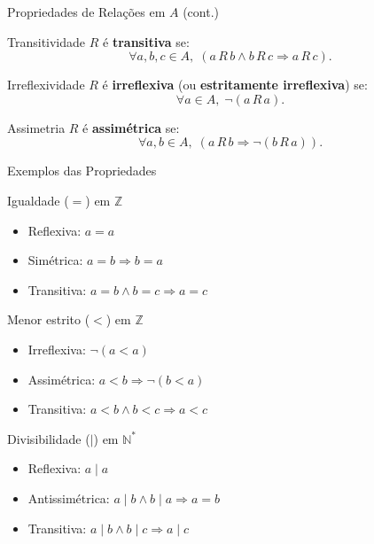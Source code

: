 \documentclass[9pt]{beamer}
\begin{document}
\begin{frame}{Propriedades de Relações em $A$ (cont.)}

\begin{block}{Transitividade}
$R$ é \textbf{transitiva} se:
\[
\forall a,b,c \in A,\; (a\,R\,b \land b\,R\,c \Rightarrow a\,R\,c).
\]
\end{block}

\begin{block}{Irreflexividade}
$R$ é \textbf{irreflexiva} (ou \textbf{estritamente irreflexiva}) se:
\[
\forall a \in A,\; \neg(a\,R\,a).
\]
\end{block}

\begin{block}{Assimetria}
$R$ é \textbf{assimétrica} se:
\[
\forall a,b \in A,\; (a\,R\,b \Rightarrow \neg(b\,R\,a)).
\]
\end{block}

\end{frame}

\begin{frame}{Exemplos das Propriedades}

\begin{block}{Igualdade ($=$) em $\mathbb{Z}$}
\begin{itemize}
  \item Reflexiva: $a = a$ \checkmark
  \item Simétrica: $a = b \Rightarrow b = a$ \checkmark
  \item Transitiva: $a = b \land b = c \Rightarrow a = c$ \checkmark
\end{itemize}
\end{block}

\begin{block}{Menor estrito ($<$) em $\mathbb{Z}$}
\begin{itemize}
  \item Irreflexiva: $\neg(a < a)$ \checkmark
  \item Assimétrica: $a < b \Rightarrow \neg(b < a)$ \checkmark
  \item Transitiva: $a < b \land b < c \Rightarrow a < c$ \checkmark
\end{itemize}
\end{block}

\begin{block}{Divisibilidade ($\mid$) em $\mathbb{N}^*$}
\begin{itemize}
  \item Reflexiva: $a \mid a$ \checkmark
  \item Antissimétrica: $a \mid b \land b \mid a \Rightarrow a = b$ \checkmark
  \item Transitiva: $a \mid b \land b \mid c \Rightarrow a \mid c$ \checkmark
\end{itemize}
\end{block}

\end{frame}
\end{document}
